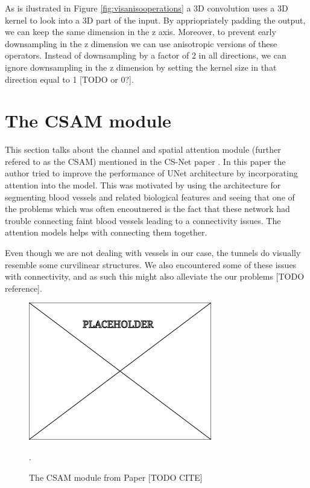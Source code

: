 \documentclass[
  digital,     %
  oneside,     %
  nosansbold,  %
  nocolorbold, %
  lof,         %
  lot,         %
]{fithesis4}
\begin{document}
As is ilustrated in Figure \ref{fig:visanisooperations} a 3D convolution
uses a 3D kernel to look into a 3D part of the input. By appriopriately padding
the output, we can keep the same dimension in the z axis. Moreover, to prevent
early downsampling in the z dimension we can use anisotropic versions of these
operators. Instead of downsampling by a factor of 2 in all directions, we can
ignore downsampling in the z dimension by setting the kernel size in that
direction equal to 1 [TODO or 0?].

\section{The CSAM module}

This section talks about the channel and spatial attention module (further
refered to as the CSAM) mentioned in the CS-Net paper \parencite{Mou2021}. In
this paper the author tried to improve the performance of UNet architecture by
incorporating attention into the model. This was motivated by using the
architecture for segmenting blood vessels and related biological features and
seeing that one of the problems which was often encoutnered is the fact that
these network had trouble connecting faint blood vessels leading to a
connectivity issues. The attention models helps with connecting them together.

Even though we are not dealing with vessels in our case, the tunnels do visually
resemble some curvilinear structures. We also encountered some of these issues
with connectivity, and as such this might also alleviate the our problems [TODO
reference].

\begin{figure}
    \begin{center}
        \includegraphics[width=0.6\linewidth]{resources/placeholder.png}
    \end{center}
    \caption{The CSAM module from Paper [TODO CITE]}.
    \label{fig:csammodule}
\end{figure}
\end{document}
